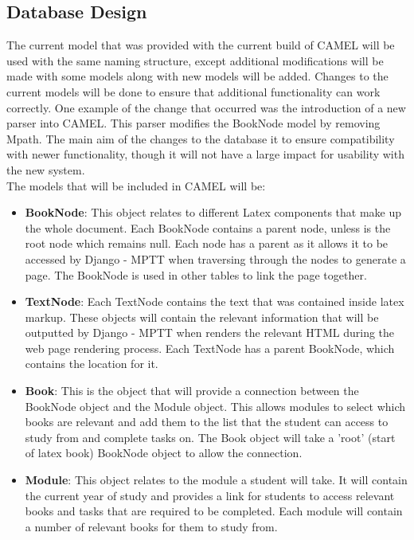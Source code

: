 \subsection{Database Design}
	The current model that was provided with the current build of CAMEL will be used with the same naming structure, except additional modifications will be made with some models along with new models will be added. Changes to the current models will be done to ensure that additional functionality can work correctly. One example of the change that occurred was the introduction of a new parser into CAMEL. This parser modifies the BookNode model by removing Mpath. The main aim of the changes to the database it to ensure compatibility with newer functionality, though it will not have a large impact for usability with the new system.\\
	
	The models that will be included in CAMEL will be:
	\begin{itemize}
		\item \textbf{BookNode}: This object relates to different Latex components that make up the whole document. Each BookNode contains a parent node, unless is the root node which remains null. Each node has a parent as it allows it to be accessed by Django - MPTT when traversing through the nodes to generate a page. The BookNode is used in other tables to link the page together.     
		
		\item \textbf{TextNode}: Each TextNode contains the text that was contained inside latex markup. These objects will contain the relevant information that will be outputted by Django - MPTT when renders the relevant HTML during the web page rendering process. Each TextNode has a parent BookNode, which contains the location for it.  
		
		\item \textbf{Book}: This is the object that will provide a connection between the BookNode object and the Module object. This allows modules to select which books are relevant and add them to the list that the student can access to study from and complete tasks on. The Book object will take a 'root' (start of latex book) BookNode object to allow the connection. 
		
		\item \textbf{Module}: This object relates to the module a student will take. It will contain the current year of study and provides a link for students to access relevant books and tasks that are required to be completed. Each module will contain a number of relevant books for them to study from.
	\end{itemize}
	
